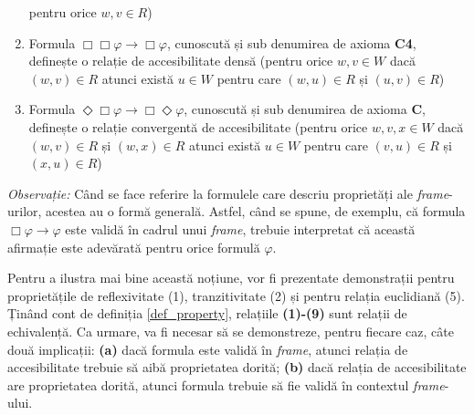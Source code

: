 \documentclass[12pt, openany]{book}
\begin{document}
\begin{enumerate}
                    pentru orice $w,v \in R$)
                    \item Formula $\Box \Box \varphi \rightarrow \Box \varphi$, cunoscută și sub denumirea de axioma \textbf{C4},
                    definește o relație de accesibilitate densă (pentru orice $w,v \in W$ dacă $(w,v) \in R$ atunci există 
                    $u \in W$ pentru care $(w,u) \in R$ și $(u,v) \in R$)
                    \item Formula $\Diamond \Box \varphi \rightarrow \Box \Diamond \varphi$, cunoscută și sub denumirea de 
                    axioma \textbf{C}, definește o relație convergentă de accesibilitate (pentru orice $w,v,x \in W$ dacă 
                    $(w,v) \in R$ și $(w,x) \in R$ atunci există $u \in W$ pentru care $(v,u) \in R$ și $(x,u) \in R$)
                \end{enumerate}
                \vspace{6pt}
            
            \par{}
                \noindent \textit{Observație:} Când se face referire la formulele care descriu proprietăți ale \textit{frame}-urilor,
                acestea au o formă generală. Astfel, când se spune, de exemplu, că formula $\Box \varphi \rightarrow 
                \varphi$ este validă în cadrul unui \textit{frame}, trebuie interpretat că această afirmație este adevărată 
                pentru orice formulă $\varphi$.

            \par{}
                Pentru a ilustra mai bine această noțiune, vor fi prezentate demonstrații pentru proprietățile de reflexivitate (1),
                tranzitivitate (2) și pentru relația euclidiană (5). Ținând cont de definiția \ref{def_property}, relațiile 
                \textbf{(1)-(9)} sunt relații de echivalență. Ca urmare, va fi necesar să se demonstreze, pentru fiecare 
                caz, câte două implicații: \textbf{(a)} dacă formula este validă în \textit{frame}, atunci relația de 
                accesibilitate trebuie să aibă proprietatea dorită; \textbf{(b)} dacă relația de accesibilitate are 
                proprietatea dorită, atunci formula trebuie să fie validă în contextul \textit{frame}-ului.
            
\end{document}
